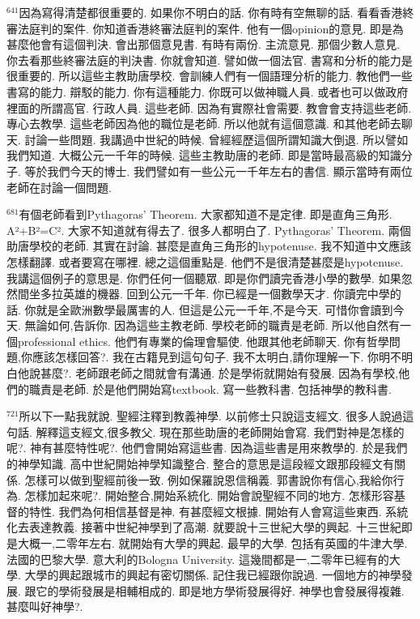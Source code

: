 \documentclass{book}
\begin{document}
$^{641}$因為寫得清楚都很重要的.
如果你不明白的話.
你有時有空無聊的話.
看看香港終審法庭判的案件.
你知道香港終審法庭判的案件.
他有一個opinion的意見.
即是為甚麼他會有這個判決.
會出那個意見書.
有時有兩份.
主流意見.
那個少數人意見.
你去看那些終審法庭的判決書.
你就會知道.
譬如做一個法官.
書寫和分析的能力是很重要的.
所以這些主教助唐學校.
會訓練人們有一個語理分析的能力.
教他們一些書寫的能力.
辯駁的能力.
你有這種能力.
你既可以做神職人員.
或者也可以做政府裡面的所謂高官.
行政人員.
這些老師.
因為有實際社會需要.
教會會支持這些老師.
專心去教學.
這些老師因為他的職位是老師.
所以他就有這個意識.
和其他老師去聊天.
討論一些問題.
我講過中世紀的時候.
曾經經歷這個所謂知識大倒退.
所以譬如我們知道.
大概公元一千年的時候.
這些主教助唐的老師.
即是當時最高級的知識分子.
等於我們今天的博士.
我們譬如有一些公元一千年左右的書信.
顯示當時有兩位老師在討論一個問題.

$^{681}$有個老師看到Pythagoras' Theorem.
大家都知道不是定律.
即是直角三角形.
A²+B²=C².
大家不知道就有得去了.
很多人都明白了.
Pythagoras' Theorem.
兩個助唐學校的老師.
其實在討論.
甚麼是直角三角形的hypotenuse.
我不知道中文應該怎樣翻譯.
或者要寫在哪裡.
總之這個重點是.
他們不是很清楚甚麼是hypotenuse.
我講這個例子的意思是.
你們任何一個聽眾.
即是你們讀完香港小學的數學.
如果忽然間坐多拉英雄的機器.
回到公元一千年.
你已經是一個數學天才.
你讀完中學的話.
你就是全歐洲數學最厲害的人.
但這是公元一千年,不是今天.
可惜你會讀到今天.
無論如何,告訴你.
因為這些主教老師.
學校老師的職責是老師.
所以他自然有一個professional ethics.
他們有專業的倫理會驅使.
他跟其他老師聊天.
你有哲學問題,你應該怎樣回答?.
我在古籍見到這句句子.
我不太明白,請你理解一下.
你明不明白他說甚麼?.
老師跟老師之間就會有溝通.
於是學術就開始有發展.
因為有學校,他們的職責是老師.
於是他們開始寫textbook.
寫一些教科書.
包括神學的教科書.

$^{721}$所以下一點我就說.
聖經注釋到教義神學.
以前修士只說這支經文.
很多人說過這句話.
解釋這支經文,很多教父.
現在那些助唐的老師開始會寫.
我們對神是怎樣的呢?.
神有甚麼特性呢?.
他們會開始寫這些書.
因為這些書是用來教學的.
於是我們的神學知識.
高中世紀開始神學知識整合.
整合的意思是這段經文跟那段經文有關係.
怎樣可以做到聖經前後一致.
例如保羅說恩信稱義.
郭書說你有信心,我給你行為.
怎樣加起來呢?.
開始整合,開始系統化.
開始會說聖經不同的地方.
怎樣形容基督的特性.
我們為何相信基督是神.
有甚麼經文根據.
開始有人會寫這些東西.
系統化去表達教義.
接著中世紀神學到了高潮.
就要說十三世紀大學的興起.
十三世紀即是大概一,二零年左右.
就開始有大學的興起.
最早的大學.
包括有英國的牛津大學.
法國的巴黎大學.
意大利的Bologna University.
這幾間都是一,二零年已經有的大學.
大學的興起跟城市的興起有密切關係.
記住我已經跟你說過.
一個地方的神學發展.
跟它的學術發展是相輔相成的.
即是地方學術發展得好.
神學也會發展得複雜.
甚麼叫好神學?.
\end{document}
